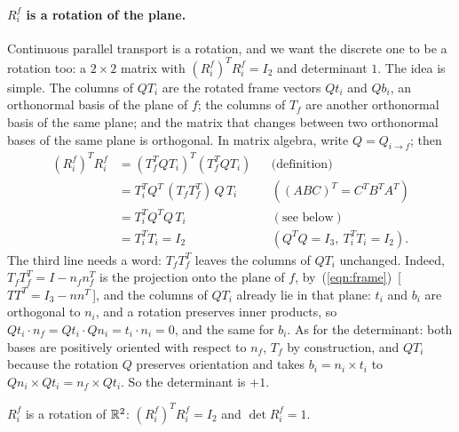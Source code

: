 \paragraph{$R_i^f$ is a rotation of the plane.} Continuous parallel transport is a rotation, and we want the discrete one to be a rotation too: a $2\times 2$ matrix with $(R_i^f)^T R_i^f = I_2$ and determinant $1$. The idea is simple. The columns of $Q T_i$ are the rotated frame vectors $Q t_i$ and $Q b_i$, an orthonormal basis of the plane of $f$; the columns of $T_f$ are another orthonormal basis of the same plane; and the matrix that changes between two orthonormal bases of the same plane is orthogonal. In matrix algebra, write $Q = Q_{i\to f}$; then
\begin{align*}
(R_i^f)^T R_i^f &= (T_f^T Q T_i)^T (T_f^T Q T_i) && \text{(definition)}\\
&= T_i^T Q^T\, (T_f T_f^T)\, Q\, T_i && ((ABC)^T = C^TB^TA^T) \\
&= T_i^T Q^T Q\, T_i && (\text{see below})\\
&= T_i^T T_i = I_2 && (Q^TQ = I_3,\ T_i^TT_i = I_2).
\end{align*}
The third line needs a word: $T_f T_f^T$ leaves the columns of $Q T_i$ unchanged. Indeed, $T_f T_f^T = I - n_f n_f^T$ is the projection onto the plane of $f$, by~(\ref{eqn:frame})~[\,$TT^T = I_3 - nn^T$\,], and the columns of $Q T_i$ already lie in that plane: $t_i$ and $b_i$ are orthogonal to $n_i$, and a rotation preserves inner products, so $Q t_i\cdot n_f = Q t_i \cdot Q n_i = t_i\cdot n_i = 0$, and the same for $b_i$. As for the determinant: both bases are positively oriented with respect to $n_f$, $T_f$ by construction, and $Q T_i$ because the rotation $Q$ preserves orientation and takes $b_i = n_i \times t_i$ to $Q n_i \times Q t_i = n_f\times Q t_i$. So the determinant is $+1$.
\begin{prop}
\label{prop:connection_rotation}
$R_i^f$ is a rotation of $\mathbb{R}^2$: $(R_i^f)^T R_i^f = I_2$ and $\det R_i^f = 1$.
\end{prop}


